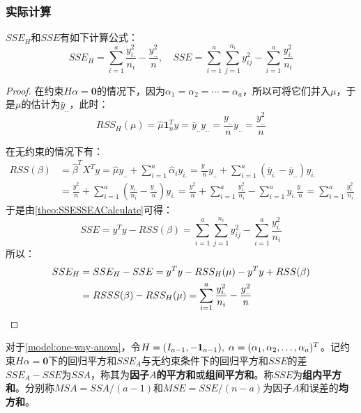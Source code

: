 \subsubsection{实际计算}
\begin{theorem}\label{theo:SSESSEACalculateAOV}
	$SSE_H$和$SSE$有如下计算公式：
	\begin{equation*}
		SSE_H=\sum_{i=1}^{a}\frac{y_{i.}^2}{n_i}-\frac{y_{..}^2}{n},\quad SSE=\sum_{i=1}^{a}\sum_{j=1}^{n_i}y_{ij}^2-\sum_{i=1}^{a}\frac{y_{i.}^2}{n_i}
	\end{equation*}
\end{theorem}
\begin{proof}
	在约束$H\alpha=\mathbf{0}$的情况下，因为$\alpha_1=\alpha_2=\cdots=\alpha_a$，所以可将它们并入$\mu$，于是$\mu$的估计为$\bar{y}_{..}$，此时：
	\begin{equation*}
		RSS_H(\mu)=\hat{\mu}\mathbf{1}_n^Ty=\bar{y}_{..}y_{..}=\frac{y_{..}}{n}y_{..}=\frac{y_{..}^2}{n}
	\end{equation*}\par
	在无约束的情况下有：
	\begin{align*}
		RSS(\beta)&=\hat{\beta}^TX^Ty=\hat{\mu}y_{..}+\sum_{i=1}^{a}\hat{\alpha}_iy_{i.} =\frac{y_{..}}{n}y_{..}+\sum_{i=1}^{a}(\bar{y}_{i.}-\bar{y}_{..})y_{i.} \\
		&=\frac{y_{..}^2}{n}+\sum_{i=1}^{a}\left(\frac{y_{i.}}{n_i}-\frac{y_{..}}{n}\right)y_{i.} =\frac{y_{..}^2}{n}+\sum_{i=1}^{a}\frac{y_{i.}^2}{n_i}-\sum_{i=1}^{a}y_{i.}\frac{y_{..}}{n}=\sum_{i=1}^{a}\frac{y_{i.}^2}{n_i}
	\end{align*}
	于是由\cref{theo:SSESSEACalculate}可得：
	\begin{equation*}
		SSE=y^Ty-RSS(\beta)=\sum_{i=1}^{a}\sum_{j=1}^{n_i}y_{ij}^2-\sum_{i=1}^{a}\frac{y_{i.}^2}{n_i}
	\end{equation*}
	所以：
	\begin{align*}
		SSE_H&=SSE_H-SSE=y^Ty-RSS_H(\mu)-y^Ty+RSS(\beta) \\
		&=RSSS(\beta)-RSS_H(\mu)=\sum_{i=1}^{a}\frac{y_{i.}^2}{n_i}-\frac{y_{..}^2}{n}\qedhere
	\end{align*}
\end{proof}
\begin{definition}
	对于\cref{model:one-way-anova}，令$H=(I_{a-1},-\mathbf{1}_{a-1}),\;\alpha=(\alpha_1, \alpha_2, \dots, \alpha_{a})^T$。记约束$H\alpha=\mathbf{0}$下的回归平方和$SSE_A$与无约束条件下的回归平方和$SSE$的差$SSE_A-SSE$为$SSA$，称其为\textbf{因子$A$的平方和}或\textbf{组间平方和}。称$SSE$为\textbf{组内平方和}。分别称$MSA=SSA/(a-1)$和$MSE=SSE/(n-a)$为因子$A$和误差的\textbf{均方和}。
\end{definition}
